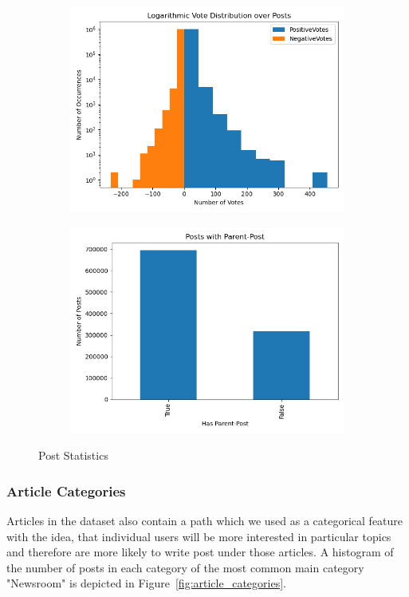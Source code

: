 \documentclass[acmsmall]{acmart}
\begin{document}
\begin{figure}[H]
\centering
\begin{subfigure}{.5\textwidth}
\centering
  \includegraphics[width=.9\linewidth]{assets/Logarithmic_Vote_Distribution_over_Posts.png}
 \end{subfigure}%
\begin{subfigure}{.5\textwidth}
\centering
  \includegraphics[width=.9\linewidth]{assets/Posts_with_parent_post.png}
 \end{subfigure}
 \caption{Post Statistics}
\label{fig:post_stats}
\end{figure}

\subsubsection{Article Categories}
Articles in the dataset also contain a path which we used as a categorical feature with the idea, that individual users will be more interested in particular topics and therefore are more likely to write post under those articles. A histogram of the number of posts in each category of the most common main category "Newsroom" is depicted in Figure~\ref{fig:article_categories}.
\end{document}
